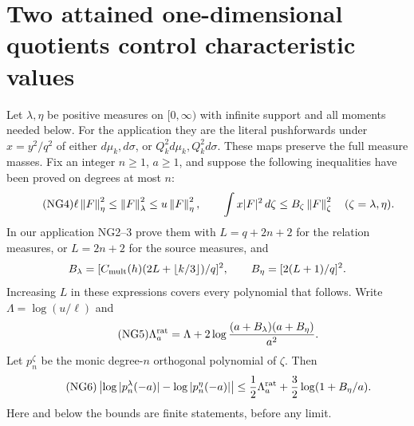 \documentclass[11pt]{article}
\begin{document}
\section{Two attained one-dimensional quotients control characteristic values}
Let $\lambda,\eta$ be positive measures on $[0,\infty)$ with infinite
support and all moments needed below. For the application they are the
literal pushforwards under $x=y^2/q^2$ of either $d\mu_k,d\sigma$, or
$Q_k^2d\mu_k,Q_k^2d\sigma$. These maps preserve the full measure masses.
Fix an integer $n\ge1$, $a\ge1$, and suppose the following inequalities
have been proved on degrees at most $n$:
\begin{equation}\tag{NG4}
 \ell\left\lVert F\right\rVert_\eta^2\le\left\lVert F\right\rVert_\lambda^2\le u\left\lVert F\right\rVert_\eta^2,
 \qquad \int x|F|^2\,d\zeta\le B_\zeta\left\lVert F\right\rVert_\zeta^2
 \quad(\zeta=\lambda,\eta).
\end{equation}
In our application NG2--3 prove them with
$L=q+2n+2$ for the relation measures, or $L=2n+2$ for the source measures,
and
\[
 B_\lambda=[C_{\rm mult}(h)(2L+\lfloor k/3\rfloor)/q]^2,
 \qquad B_\eta=[2(L+1)/q]^2.
\]
Increasing $L$ in these expressions covers every polynomial that follows.
Write $\Lambda=\log(u/\ell)$ and
\begin{equation}\tag{NG5}
 \Lambda_a^{\rm rat}=\Lambda+
       2\log\frac{(a+B_\lambda)(a+B_\eta)}{a^2}.
\end{equation}
Let $p_n^\zeta$ be the monic degree-$n$ orthogonal polynomial of $\zeta$.
Then
\begin{equation}\tag{NG6}
 \left|\log|p_n^\lambda(-a)|-\log|p_n^\eta(-a)|\right|
 \le\frac12\Lambda_a^{\rm rat}
                   +\frac32\log(1+B_\eta/a).
\end{equation}
Here and below the bounds are finite statements, before any limit.
\end{document}
